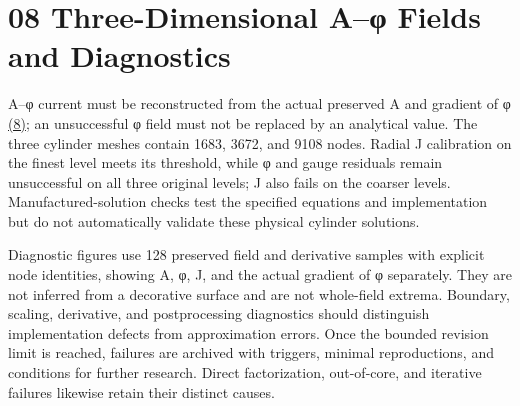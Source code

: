\documentclass[journal,10pt]{IEEEtran}
\begin{document}
\section*{08 Three-Dimensional A–φ Fields and Diagnostics}
\hypertarget{chapter-08}{}
A–φ current must be reconstructed from the actual preserved A and gradient of φ \href{report_en_ieee.pdf#E07}{(8)}; an unsuccessful φ field must not be replaced by an analytical value. The three cylinder meshes contain 1683, 3672, and 9108 nodes. Radial J calibration on the finest level meets its threshold, while φ and gauge residuals remain unsuccessful on all three original levels; J also fails on the coarser levels. Manufactured-solution checks test the specified equations and implementation but do not automatically validate these physical cylinder solutions.


Diagnostic figures use 128 preserved field and derivative samples with explicit node identities, showing A, φ, J, and the actual gradient of φ separately. They are not inferred from a decorative surface and are not whole-field extrema. Boundary, scaling, derivative, and postprocessing diagnostics should distinguish implementation defects from approximation errors. Once the bounded revision limit is reached, failures are archived with triggers, minimal reproductions, and conditions for further research. Direct factorization, out-of-core, and iterative failures likewise retain their distinct causes.
\end{document}

